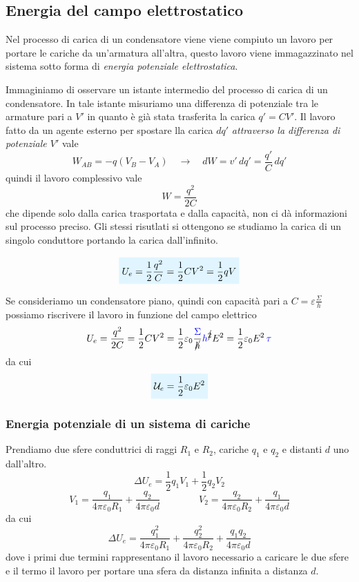 \documentclass[x11names]{report}
\begin{document}
\subsection{Energia del campo elettrostatico}
Nel processo di carica di un condensatore viene viene compiuto un lavoro per portare le cariche da un'armatura all'altra, questo lavoro viene immagazzinato nel sistema sotto forma di \textit{energia potenziale elettrostatica}.

Immaginiamo di osservare un istante intermedio del processo di carica di un condensatore. In tale istante misuriamo una differenza di potenziale tra le armature pari a \(V'\) in quanto è già stata trasferita la carica \(q' = CV'\). Il lavoro fatto da un agente esterno per spostare lla carica \(dq'\) \textit{attraverso la differenza di potenziale \(V'\)} vale
\[
W_{AB} = -q(V_B-V_A) \quad \to \quad dW = v'\, dq' = \frac{q'}{C}\, dq'
\]
quindi il lavoro complessivo vale
\[
W = \frac{q^2}{2C}
\]
che dipende solo dalla carica trasportata e dalla capacità, non ci dà informazioni sul processo preciso. Gli stessi risutlati si ottengono se studiamo la carica di un singolo conduttore portando la carica dall'infinito.

\begin{equation}
	\viola{U_e = \frac{1}{2}\frac{q^2}{C} = \frac{1}{2}CV^2 = \frac{1}{2}qV}
\end{equation}

Se consideriamo un condensatore piano, quindi con capacità pari a \(C=\varepsilon\frac{\Sigma}{h}\) possiamo riscrivere il lavoro in funzione del campo elettrico
\[
U_e = \frac{q^2}{2C}  = \frac{1}{2}CV^2 =  \frac{1}{2}\varepsilon_0\frac{\textcolor{blue}{\Sigma}}{\cancel{h}}\textcolor{blue}{h}^{\cancel{2}}E^2 = \frac{1}{2}\varepsilon_0 E^2 \, \textcolor{blue}{\tau}
\]
da cui
\begin{equation}
	\viola{\mathcal{U}_e = \frac{1}{2}\varepsilon_0 E^2}
\end{equation}

\subsubsection{Energia potenziale di un sistema di cariche}
Prendiamo due sfere conduttrici di raggi \(R_1\) e \(R_2\), cariche \(q_1\) e \(q_2\) e  distanti \(d\) uno dall'altro.
\[
	\Delta U_e = \frac{1}{2}q_1V_1 + \frac{1}{2}q_2V_2
\]
\[
 V_1 = \frac{q_1}{4\pi \varepsilon_0 R_1} + \frac{q_2}{4\pi \varepsilon_0 d} \qquad \qquad V_2 = \frac{q_2}{4\pi \varepsilon_0 R_2} + \frac{q_1}{4\pi \varepsilon_0 d}
\]
da cui
\[
	\Delta U_e = \frac{q_1^2}{4\pi \varepsilon_0 R_1} + \frac{q_2^2}{4\pi \varepsilon_0 R_2} +\frac{q_1q_2}{4\pi \varepsilon_0 d} 
\]
dove i primi due termini rappresentano il lavoro necessario a caricare le due sfere e il termo il lavoro per portare una sfera da distanza infinita a distanza \(d\).
\end{document}
